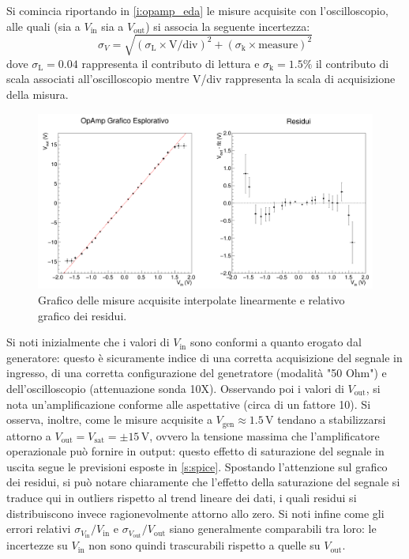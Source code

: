\documentclass[a4paper,11pt]{article} %
\begin{document}
Si comincia riportando in \autoref{i:opamp_eda} le misure acquisite con l'oscilloscopio, alle quali (sia a
$V_{\text{in}}$ sia a $V_{\text{out}}$) si associa la seguente incertezza:
\begin{equation}\label{e:osc}
	\sigma_{V} = \sqrt{ (\sigma_{\text{L}}\times\text{V/div})^2 + (\sigma_{\text{k}}\times\text{measure})^2 }
\end{equation}
\noindent dove $\sigma_{\text{L}}=0.04$ rappresenta il contributo di lettura e $\sigma_{\text{k}}=1.5\%$ il contributo di scala
associati all'oscilloscopio mentre V/div rappresenta la scala di acquisizione della misura.
\begin{figure}[H]
	\centering
	\includegraphics[width=\linewidth]{../Plots/Report_Plots/opamp_plot_alldata_eda.png}
	\caption{\small Grafico delle misure acquisite interpolate linearmente e relativo grafico dei residui.}
	\label{i:opamp_eda}
\end{figure}
\noindent Si noti inizialmente che i valori di $V_{\text{in}}$ sono conformi a quanto erogato dal generatore: questo è
sicuramente indice di una corretta acquisizione del segnale in ingresso, di una corretta configurazione del genetratore
(modalità "50 Ohm") e dell'oscilloscopio (attenuazione sonda 10X). Osservando poi i valori di $V_{\text{out}}$, si nota
un'amplificazione conforme alle aspettative (circa di un fattore 10). Si osserva, inoltre, come le misure acquisite a
$V_{\text{gen}}\approx 1.5\,\si{\volt}$ tendano a stabilizzarsi attorno a $V_{\text{out}}=V_{\text{sat}}=\pm
15\,\si{\volt}$, ovvero la tensione massima che l'amplificatore operazionale può fornire in output: questo effetto di
saturazione del segnale in uscita segue le previsioni esposte in \autoref{s:spice}. Spostando l'attenzione sul grafico
dei residui, si può notare chiaramente che l'effetto della saturazione del segnale si traduce qui in outliers rispetto
al trend lineare dei dati, i quali residui si distribuiscono invece ragionevolmente attorno allo zero. Si noti infine
come gli errori relativi $\sigma_{V_{\text{in}}}/V_{\text{in}}$ e $\sigma_{V_{\text{out}}}/V_{\text{out}}$ siano
generalmente comparabili tra loro: le incertezze su $V_{\text{in}}$ non sono quindi trascurabili rispetto a quelle su
$V_{\text{out}}$.
\end{document}
